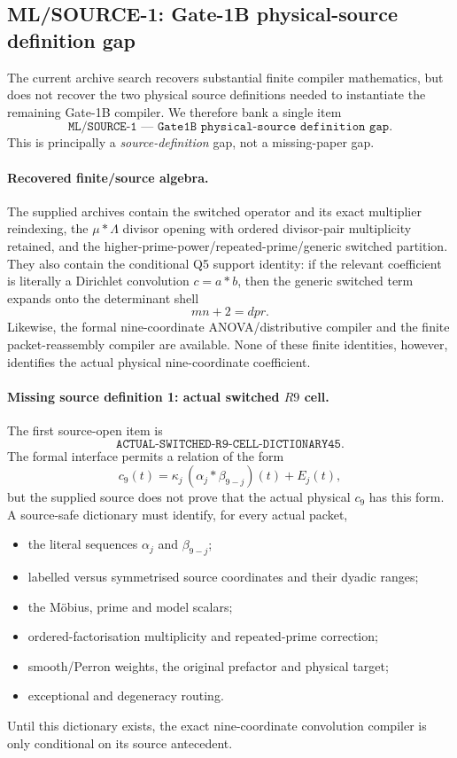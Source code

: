 \documentclass[11pt]{article}
\theoremstyle{definition}
\newcommand{\1}{\mathbf 1}
\begin{document}
\subsection{ML/SOURCE-1: Gate-1B physical-source definition gap}
\label{app:ml-source-1}

The current archive search recovers substantial finite compiler mathematics,
but does not recover the two physical source definitions needed to instantiate
the remaining Gate-1B compiler.  We therefore bank a single item
\[
   \boxed{\texttt{ML/SOURCE-1 --- Gate1B physical-source definition gap}}.
\]
This is principally a \emph{source-definition} gap, not a missing-paper gap.

\paragraph{Recovered finite/source algebra.}
The supplied archives contain the switched operator and its exact multiplier
reindexing, the $\mu*\Lambda$ divisor opening with ordered divisor-pair
multiplicity retained, and the higher-prime-power/repeated-prime/generic
switched partition.  They also contain the conditional Q5 support identity:
if the relevant coefficient is literally a Dirichlet convolution $c=a*b$,
then the generic switched term expands onto the determinant shell
\[
        mn+2=dpr.
\]
Likewise, the formal nine-coordinate ANOVA/distributive compiler and the
finite packet-reassembly compiler are available.  None of these finite
identities, however, identifies the actual physical nine-coordinate
coefficient.

\paragraph{Missing source definition 1: actual switched $R9$ cell.}
The first source-open item is
\[
  \boxed{\texttt{ACTUAL-SWITCHED-R9-CELL-DICTIONARY45}}.
\]
The formal interface permits a relation of the form
\[
  c_9(t)=\kappa_j\,(\alpha_j*\beta_{9-j})(t)+E_j(t),
\]
but the supplied source does not prove that the actual physical $c_9$ has
this form.  A source-safe dictionary must identify, for every actual packet,
\begin{itemize}
  \item the literal sequences $\alpha_j$ and $\beta_{9-j}$;
  \item labelled versus symmetrised source coordinates and their dyadic
        ranges;
  \item the M\"obius, prime and model scalars;
  \item ordered-factorisation multiplicity and repeated-prime correction;
  \item smooth/Perron weights, the original prefactor and physical target;
  \item exceptional and degeneracy routing.
\end{itemize}
Until this dictionary exists, the exact nine-coordinate convolution compiler
is only conditional on its source antecedent.
\end{document}
